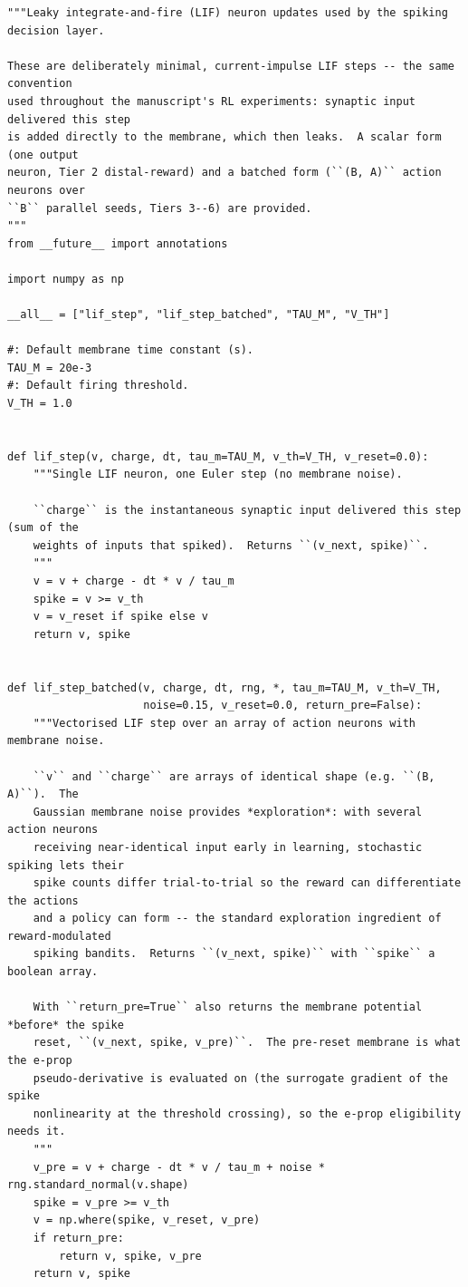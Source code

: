 \begin{lstlisting}[caption={mrl\_trace/neurons.py},label={lst:siox-src-neurons}]
"""Leaky integrate-and-fire (LIF) neuron updates used by the spiking decision layer.

These are deliberately minimal, current-impulse LIF steps -- the same convention
used throughout the manuscript's RL experiments: synaptic input delivered this step
is added directly to the membrane, which then leaks.  A scalar form (one output
neuron, Tier 2 distal-reward) and a batched form (``(B, A)`` action neurons over
``B`` parallel seeds, Tiers 3--6) are provided.
"""
from __future__ import annotations

import numpy as np

__all__ = ["lif_step", "lif_step_batched", "TAU_M", "V_TH"]

#: Default membrane time constant (s).
TAU_M = 20e-3
#: Default firing threshold.
V_TH = 1.0


def lif_step(v, charge, dt, tau_m=TAU_M, v_th=V_TH, v_reset=0.0):
    """Single LIF neuron, one Euler step (no membrane noise).

    ``charge`` is the instantaneous synaptic input delivered this step (sum of the
    weights of inputs that spiked).  Returns ``(v_next, spike)``.
    """
    v = v + charge - dt * v / tau_m
    spike = v >= v_th
    v = v_reset if spike else v
    return v, spike


def lif_step_batched(v, charge, dt, rng, *, tau_m=TAU_M, v_th=V_TH,
                     noise=0.15, v_reset=0.0, return_pre=False):
    """Vectorised LIF step over an array of action neurons with membrane noise.

    ``v`` and ``charge`` are arrays of identical shape (e.g. ``(B, A)``).  The
    Gaussian membrane noise provides *exploration*: with several action neurons
    receiving near-identical input early in learning, stochastic spiking lets their
    spike counts differ trial-to-trial so the reward can differentiate the actions
    and a policy can form -- the standard exploration ingredient of reward-modulated
    spiking bandits.  Returns ``(v_next, spike)`` with ``spike`` a boolean array.

    With ``return_pre=True`` also returns the membrane potential *before* the spike
    reset, ``(v_next, spike, v_pre)``.  The pre-reset membrane is what the e-prop
    pseudo-derivative is evaluated on (the surrogate gradient of the spike
    nonlinearity at the threshold crossing), so the e-prop eligibility needs it.
    """
    v_pre = v + charge - dt * v / tau_m + noise * rng.standard_normal(v.shape)
    spike = v_pre >= v_th
    v = np.where(spike, v_reset, v_pre)
    if return_pre:
        return v, spike, v_pre
    return v, spike
\end{lstlisting}

